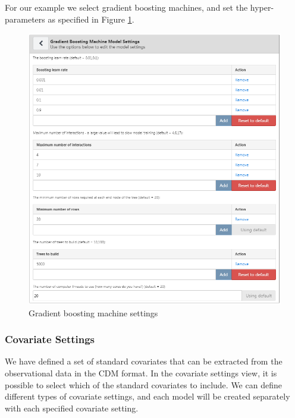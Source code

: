\documentclass[11pt]{book}
\theoremstyle{definition}
\theoremstyle{definition}
\theoremstyle{definition}
\theoremstyle{remark}
\begin{document}
For our example we select gradient boosting machines, and set the hyper-parameters as specified in Figure \ref{fig:gbmSettings}.

\begin{figure}

{\centering \includegraphics[width=1\linewidth]{images/PatientLevelPrediction/gbmSettings} 

}

\caption{Gradient boosting machine settings}\label{fig:gbmSettings}
\end{figure}

\hypertarget{covariate-settings-1}{%
\subsubsection*{Covariate Settings}\label{covariate-settings-1}}

We have defined a set of standard covariates that can be extracted from the observational data in the CDM format. In the covariate settings view, it is possible to select which of the standard covariates to include. We can define different types of covariate settings, and each model will be created separately with each specified covariate setting.
\end{document}
